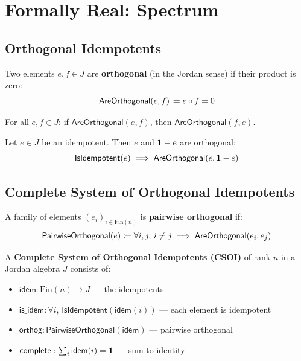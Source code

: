 \section{Formally Real: Spectrum}

\subsection{Orthogonal Idempotents}

\begin{definition}[AreOrthogonal]
Two elements $e, f \in J$ are \textbf{orthogonal} (in the Jordan sense) if their product is zero:
\[ \mathsf{AreOrthogonal}(e, f) \coloneqq e \circ f = 0 \]
\end{definition}

\begin{lemma}
For all $e, f \in J$: if $\mathsf{AreOrthogonal}(e, f)$, then $\mathsf{AreOrthogonal}(f, e)$.
\end{lemma}

\begin{theorem}
Let $e \in J$ be an idempotent. Then $e$ and $\mathbf{1} - e$ are orthogonal:
\[ \mathsf{IsIdempotent}(e) \implies \mathsf{AreOrthogonal}(e, \mathbf{1} - e) \]
\end{theorem}

\subsection{Complete System of Orthogonal Idempotents}

\begin{definition}[PairwiseOrthogonal]
A family of elements $(e_i)_{i \in \mathrm{Fin}(n)}$ is \textbf{pairwise orthogonal} if:
\[ \mathsf{PairwiseOrthogonal}(e) \coloneqq \forall i, j,\, i \ne j \implies \mathsf{AreOrthogonal}(e_i, e_j) \]
\end{definition}

\begin{definition}[CSOI]
A \textbf{Complete System of Orthogonal Idempotents (CSOI)} of rank $n$ in a Jordan algebra $J$ consists of:
\begin{itemize}
  \item $\mathsf{idem} : \mathrm{Fin}(n) \to J$ --- the idempotents
  \item $\mathsf{is\_idem} : \forall i,\, \mathsf{IsIdempotent}(\mathsf{idem}(i))$ --- each element is idempotent
  \item $\mathsf{orthog} : \mathsf{PairwiseOrthogonal}(\mathsf{idem})$ --- pairwise orthogonal
  \item $\mathsf{complete} : \sum_{i} \mathsf{idem}(i) = \mathbf{1}$ --- sum to identity
\end{itemize}
\end{definition}

